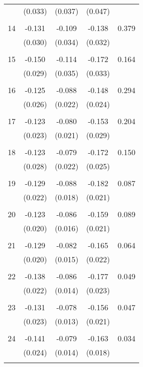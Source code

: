 \begin{tabular}{l*{1}{cccc}}
          & (0.033) & (0.037) & (0.047) & \\
 & & & &\\
  14       & -0.131 & -0.109 & -0.138 & 0.379 \\
          & (0.030) & (0.034) & (0.032) & \\
 & & & &\\
  15       & -0.150 & -0.114 & -0.172 & 0.164 \\
          & (0.029) & (0.035) & (0.033) & \\
 & & & &\\
  16       & -0.125 & -0.088 & -0.148 & 0.294 \\
          & (0.026) & (0.022) & (0.024) & \\
 & & & &\\
  17       & -0.123 & -0.080 & -0.153 & 0.204 \\
          & (0.023) & (0.021) & (0.029) & \\
 & & & &\\
  18       & -0.123 & -0.079 & -0.172 & 0.150 \\
          & (0.028) & (0.022) & (0.025) & \\
 & & & &\\
  19       & -0.129 & -0.088 & -0.182 & 0.087 \\
          & (0.022) & (0.018) & (0.021) & \\
 & & & &\\
  20       & -0.123 & -0.086 & -0.159 & 0.089 \\
          & (0.020) & (0.016) & (0.021) & \\
 & & & &\\
  21       & -0.129 & -0.082 & -0.165 & 0.064 \\
          & (0.020) & (0.015) & (0.022) & \\
 & & & &\\
  22       & -0.138 & -0.086 & -0.177 & 0.049 \\
          & (0.022) & (0.014) & (0.023) & \\
 & & & &\\
  23       & -0.131 & -0.078 & -0.156 & 0.047 \\
          & (0.023) & (0.013) & (0.021) & \\
 & & & &\\
  24       & -0.141 & -0.079 & -0.163 & 0.034 \\
          & (0.024) & (0.014) & (0.018) & \\
 & & & &\\

\end{tabular}
